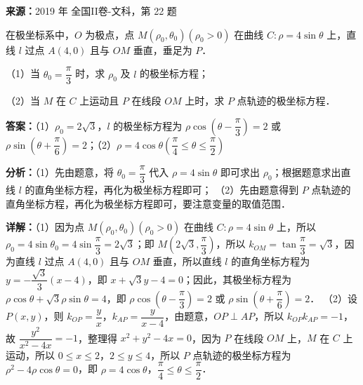 \begin{question}[points=10]
\textbf{来源：}2019 年 全国II卷-文科，第 22 题\par
[选修 4-4：坐标系与参数方程]

在极坐标系中，$O$ 为极点，点 $M(\rho_0,\theta_0)(\rho_0>0)$ 在曲线 $C:\rho=4\sin\theta$ 上，直线 $l$ 过点 $A(4,0)$ 且与 $OM$ 垂直，垂足为 $P$．

（1）当 $\theta_0=\dfrac{\pi}{3}$ 时，求 $\rho_0$ 及 $l$ 的极坐标方程；

（2）当 $M$ 在 $C$ 上运动且 $P$ 在线段 $OM$ 上时，求 $P$ 点轨迹的极坐标方程．
\begin{solution}
\textbf{答案：}（1）$\rho_0=2\sqrt{3}$，$l$ 的极坐标方程为 $\rho\cos\left(\theta-\dfrac{\pi}{3}\right)=2$ 或 $\rho\sin\left(\theta+\dfrac{\pi}{6}\right)=2$；（2）$\rho=4\cos\theta\left(\dfrac{\pi}{4}\le\theta\le\dfrac{\pi}{2}\right)$

\textbf{分析：}（1）先由题意，将 $\theta_0=\dfrac{\pi}{3}$ 代入 $\rho=4\sin\theta$ 即可求出 $\rho_0$；根据题意求出直线 $l$ 的直角坐标方程，再化为极坐标方程即可；
（2）先由题意得到 $P$ 点轨迹的直角坐标方程，再化为极坐标方程即可，要注意变量的取值范围．

\textbf{详解：}（1）因为点 $M(\rho_0,\theta_0)(\rho_0>0)$ 在曲线 $C:\rho=4\sin\theta$ 上，所以 $\rho_0=4\sin\theta_0=4\sin\dfrac{\pi}{3}=2\sqrt{3}$；即 $M\left(2\sqrt{3},\dfrac{\pi}{3}\right)$，所以 $k_{OM}=\tan\dfrac{\pi}{3}=\sqrt{3}$，因为直线 $l$ 过点 $A(4,0)$ 且与 $OM$ 垂直，所以直线 $l$ 的直角坐标方程为 $y=-\dfrac{\sqrt{3}}{3}(x-4)$，即 $x+\sqrt{3}y-4=0$；因此，其极坐标方程为 $\rho\cos\theta+\sqrt{3}\rho\sin\theta=4$，即 $\rho\cos\left(\theta-\dfrac{\pi}{3}\right)=2$ 或 $\rho\sin\left(\theta+\dfrac{\pi}{6}\right)=2$．
（2）设 $P(x,y)$，则 $k_{OP}=\dfrac{y}{x}$，$k_{AP}=\dfrac{y}{x-4}$，由题意，$OP\perp AP$，所以 $k_{OP}k_{AP}=-1$，故 $\dfrac{y^2}{x^2-4x}=-1$，整理得 $x^2+y^2-4x=0$，因为 $P$ 在线段 $OM$ 上，$M$ 在 $C$ 上运动，所以 $0\le x\le2$，$2\le y\le4$，所以 $P$ 点轨迹的极坐标方程为 $\rho^2-4\rho\cos\theta=0$，即 $\rho=4\cos\theta$，$\dfrac{\pi}{4}\le\theta\le\dfrac{\pi}{2}$．
\end{solution}
\end{question}

